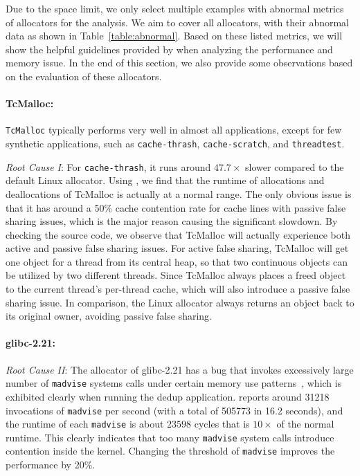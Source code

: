 Due to the space limit, we only select multiple examples with abnormal metrics of allocators for the analysis. We aim to cover all allocators, with their abnormal data as shown in Table~\ref{table:abnormal}. Based on these listed metrics, we will show the helpful guidelines provided by \MP{} when analyzing the performance and memory issue. In the end of this section, we also provide some observations based on the evaluation of these allocators.  

 \paragraph{TcMalloc:}
\texttt{TcMalloc} typically performs very well in almost all applications, except for few synthetic applications, such as \texttt{cache-thrash}, \texttt{cache-scratch}, and \texttt{threadtest}. 

\textit{Root Cause \RN{1}}:
For \texttt{cache-thrash}, it runs around $47.7\times$ slower compared to the default Linux allocator. Using \MP{}, we find that the runtime of allocations and deallocations of TcMalloc is actually at a normal range. The only obvious issue is that it has around a 50\% cache contention rate for cache lines with passive false sharing issues, which is the major reason causing the significant slowdown. By checking the source code, we observe that TcMalloc will actually experience both active and passive false sharing issues. For active false sharing, TcMalloc will get one object for a thread from its central heap, so that two continuous objects can be utilized by two different threads. Since TcMalloc always places a freed object to the current thread's per-thread cache, which will also introduce a passive false sharing issue. In comparison, the Linux allocator always returns an object back to its original owner, avoiding passive false sharing.  

\paragraph{glibc-2.21:}
\textit{Root Cause \RN{2}}: The allocator of glibc-2.21 has a bug that invokes excessively large number of \texttt{madvise} systems calls under certain memory use patterns~\cite{madvise}, which is exhibited clearly when running the dedup application. \MP{} reports around 31218 invocations of \texttt{madvise} per second (with a total of 505773 in 16.2 seconds), and the runtime of each \texttt{madvise} is about $23598$ cycles that is $10\times$ of the normal runtime. This clearly indicates that too many \texttt{madvise} system calls introduce contention inside the kernel. Changing the threshold of \texttt{madvise} improves the performance by 20\%.

